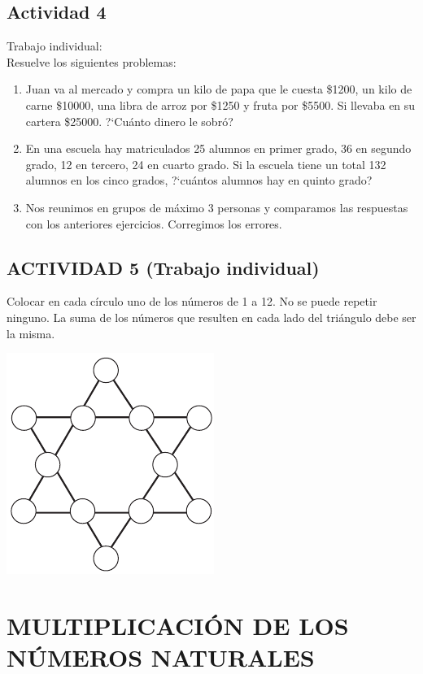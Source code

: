 \documentclass[10pt,twoside]{article}
\begin{document}
\subsection*{Actividad 4}
Trabajo individual:\\
Resuelve los siguientes problemas:
\begin{enumerate}
 \item Juan va al mercado y compra un kilo de papa que le cuesta \$1200, un kilo de carne \$10000, una libra de arroz por \$1250 y fruta por \$5500. Si llevaba en su cartera \$25000. ?`Cu\'anto dinero le sobr\'o?
\item En una escuela hay matriculados 25 alumnos en primer grado, 36 en segundo grado, 12 en tercero, 24 en cuarto grado. Si la escuela tiene un total 132 alumnos en los cinco grados, ?`cu\'antos alumnos hay en quinto grado?
\item Nos reunimos en grupos de m\'aximo 3 personas y comparamos las respuestas con los anteriores ejercicios. Corregimos los errores.
\end{enumerate}
\subsection*{ACTIVIDAD 5 (Trabajo individual)}
Colocar en cada c\'irculo uno de los n\'umeros de 1 a 12. No se puede repetir ninguno. La suma de los n\'umeros que resulten en cada lado del tri\'angulo debe ser la misma.
\begin{center}
 \includegraphics{Images/estrella.png}
\end{center}
\section*{MULTIPLICACI\'ON DE LOS N\'UMEROS NATURALES}
\end{document}
